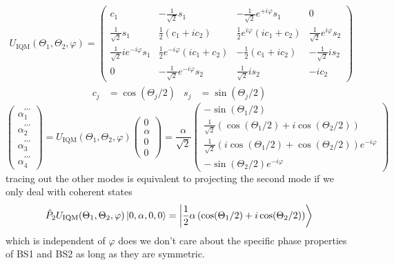 \begin{equation}
	\begin{split}
		U_\text{IQM}(\Theta_1,\Theta_2,\varphi)
		=
		\begin{pmatrix}
			c_1 & -\frac{1}{\sqrt{2}}s_1 & -\frac{1}{\sqrt{2}}e^{+i\varphi}s_1 & 0 \\
			\frac{1}{\sqrt{2}}s_1 & \frac{1}{2}(c_1+ic_2) & \frac{1}{2}e^{i\varphi}(ic_1+c_2) & \frac{1}{\sqrt{2}}e^{i\varphi}s_2 \\
			\frac{1}{\sqrt{2}}ie^{-i\varphi}s_1 & \frac{1}{2}e^{-i\varphi}(ic_1+c_2) & -\frac{1}{2}(c_1+ic_2) & -\frac{1}{\sqrt{2}}is_2 \\
			0 & -\frac{1}{\sqrt{2}}e^{-i\varphi}s_2 & \frac{1}{\sqrt{2}}is_2 & -ic_2
		\end{pmatrix}
	\end{split}
\end{equation}
\begin{align}
	c_j
	&=
	\cos(\Theta_j/2)
	&
	s_j
	&=
	\sin(\Theta_j/2)
\end{align}
\begin{equation}
	\begin{pmatrix}
		\alpha_1^{\prime\prime\prime} \\
		\alpha_2^{\prime\prime\prime} \\
		\alpha_3^{\prime\prime\prime} \\
		\alpha_4^{\prime\prime\prime}
	\end{pmatrix}
	=
	U_\text{IQM}(\Theta_1,\Theta_2,\varphi)
	\begin{pmatrix}
		0 \\
		\alpha \\
		0 \\ 
		0
	\end{pmatrix}
	=
	\frac{\alpha}{\sqrt{2}}
	\begin{pmatrix}
		-\sin(\Theta_1/2) \\
		\frac{1}{\sqrt{2}}\left(\cos(\Theta_1/2)+i\cos(\Theta_2/2)\right) \\
		\frac{1}{\sqrt{2}}\left(i\cos(\Theta_1/2)+\cos(\Theta_2/2)\right)e^{-i\varphi} \\
		-\sin(\Theta_2/2)e^{-i\varphi}
	\end{pmatrix}
\end{equation}
tracing out the other modes is equivalent to projecting the second mode if we only deal with coherent states
\begin{equation}
	\hat{P}_2
	U_\text{IQM}(\Theta_1,\Theta_2,\varphi)
	\ket{0,\alpha,0,0}
	=
	\ket{\frac{1}{2}\alpha\left(\cos(\Theta_1/2)+i\cos(\Theta_2/2)\right)}
\end{equation}
which is independent of $\varphi$ does we don't care about the specific phase properties of BS1 and BS2 as long as they are symmetric.

